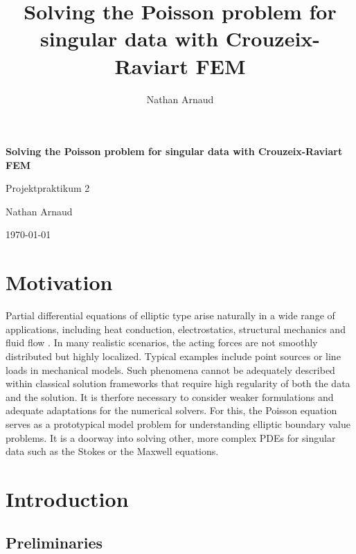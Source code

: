 \documentclass[11pt,a4paper]{article}
\title{\textbf{Solving the Poisson problem for singular data with Crouzeix-Raviart FEM}}
\author{Nathan Arnaud}
\begin{document}
\begin{titlepage}
    \centering
    \vspace*{3cm}
    
    {\LARGE\textbf{Solving the Poisson problem for singular data with Crouzeix-Raviart FEM}\par}
    
    \vspace{1.2cm}
    
    {\large Projektpraktikum 2\par}
    
    \vspace{1.5cm}
    
    {\large Nathan Arnaud\par}
    
    \vfill
    
    {\large \today\par}
\end{titlepage}
\setcounter{tocdepth}{2}
\tableofcontents
\newpage
\setcounter{section}{-1}
\section{Motivation}
\label{sec: motivation}
Partial differential equations of elliptic type arise naturally in a wide range of applications, including heat conduction, electrostatics, structural mechanics and fluid flow \cite[pp. 3-7]{Evans2000}. In many realistic scenarios, the acting forces are not smoothly distributed but highly localized. Typical examples include point sources or line loads in mechanical models. Such phenomena cannot be adequately described within classical solution frameworks that require high regularity of both the data and the solution. It is therfore necessary to consider weaker formulations and adequate adaptations for the numerical solvers. For this, the Poisson equation serves as a prototypical model problem for understanding elliptic boundary value problems. It is a doorway into solving other, more complex PDEs for singular data such as the Stokes or the Maxwell equations.
\section{Introduction}
\label{sec: introduction}
\subsection{Preliminaries}
\label{subsec: preliminaries}
\end{document}
